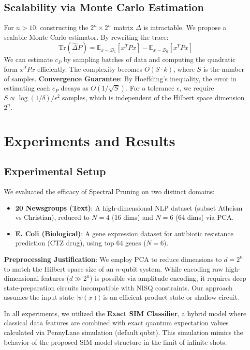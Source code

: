 \documentclass[conference]{IEEEtran}
\begin{document}
\subsection{Scalability via Monte Carlo Estimation}
For $n > 10$, constructing the $2^n \times 2^n$ matrix $\Delta$ is intractable. We propose a scalable Monte Carlo estimator. By rewriting the trace:
\begin{equation}
    \text{Tr}(\hat{\Delta} P) = \mathbb{E}_{x \sim \mathcal{D}_1}[x^T P x] - \mathbb{E}_{x \sim \mathcal{D}_0}[x^T P x]
\end{equation}
We can estimate $c_P$ by sampling batches of data and computing the quadratic form $x^T P x$ efficiently. The complexity becomes $O(S \cdot k)$, where $S$ is the number of samples.
\textbf{Convergence Guarantee}: By Hoeffding's inequality, the error in estimating each $c_P$ decays as $O(1/\sqrt{S})$. For a tolerance $\epsilon$, we require $S \propto \log(1/\delta)/\epsilon^2$ samples, which is independent of the Hilbert space dimension $2^n$.

\section{Experiments and Results}

\subsection{Experimental Setup}
We evaluated the efficacy of Spectral Pruning on two distinct domains:
\begin{itemize}
    \item \textbf{20 Newsgroups (Text)}: A high-dimensional NLP dataset (subset Atheism vs Christian), reduced to $N=4$ (16 dims) and $N=6$ (64 dims) via PCA.
    \item \textbf{E. Coli (Biological)}: A gene expression dataset for antibiotic resistance prediction (CTZ drug), using top 64 genes ($N=6$).
\end{itemize}
\textbf{Preprocessing Justification}: We employ PCA to reduce dimensions to $d=2^n$ to match the Hilbert space size of an $n$-qubit system. While encoding raw high-dimensional features ($d \gg 2^n$) is possible via amplitude encoding, it requires deep state-preparation circuits incompatible with NISQ constraints. Our approach assumes the input state $|\psi(x)\rangle$ is an efficient product state or shallow circuit.

In all experiments, we utilized the \textbf{Exact SIM Classifier}, a hybrid model where classical data features are combined with exact quantum expectation values calculated via PennyLane simulation (default.qubit). This simulation mimics the behavior of the proposed SIM model structure \cite{tiblias2025efficient} in the limit of infinite shots.
\end{document}

